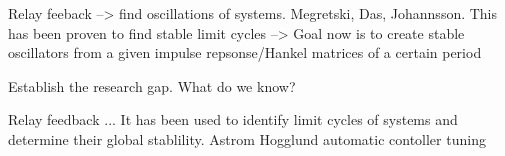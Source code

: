 Relay feeback --> find oscillations of systems. Megretski, Das, Johannsson. This has been proven to find stable limit cycles --> Goal now is to create stable oscillators from a given impulse repsonse/Hankel matrices of a certain period

Establish the research gap.
What do we know? 

Relay feedback ...
It has been used to identify limit cycles of systems and determine their global stablility. Astrom Hogglund automatic contoller tuning

